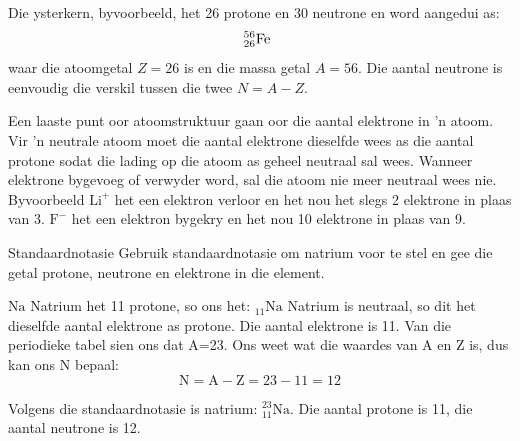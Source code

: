 Die ysterkern, byvoorbeeld, het 26 protone en 30 neutrone en word aangedui as:
\begin{equation*}
_{26}^{56}\text{Fe}\phantom{\rule{4pt}{0ex}}
\end{equation*}
waar die atoomgetal $Z = 26$ is en die massa getal $A = 56$. Die aantal neutrone is
eenvoudig die verskil tussen die twee $N = A - Z$. \par 


Een laaste punt oor atoomstruktuur gaan oor die aantal elektrone in 'n atoom. Vir 'n neutrale atoom moet die aantal elektrone dieselfde wees as die aantal protone sodat die lading op die atoom as geheel neutraal sal wees. Wanneer elektrone bygevoeg of verwyder word, sal die atoom nie meer neutraal wees nie. Byvoorbeeld $\text{Li}^{+}$ het een elektron verloor en het nou het slegs 2 elektrone in plaas van 3. $\text{F}^{-}$ het een elektron bygekry en het nou 10 elektrone in plaas van 9.   
\begin{wex}
{%
Standaardnotasie
}
{%
Gebruik standaardnotasie om natrium voor te stel en gee die getal protone, neutrone en elektrone in die element.
}
{%
 $\text{Na}$
 Natrium het 11 protone, so ons het: ${}_{11}\text{Na}$
 Natrium is neutraal, so dit het dieselfde aantal elektrone as protone. Die aantal elektrone is 11.
 Van die periodieke tabel sien ons dat A=23.
Ons weet wat die waardes van A en Z is, dus kan  ons N bepaal:
$$ \text{N} = \text{A} - \text{Z} = 23 - 11 = 12 $$

 Volgens die standaardnotasie is natrium: $_{11}^{23}\text{Na}$. Die aantal protone is 11, die aantal neutrone is 12. 
}    
\end{wex}
    

